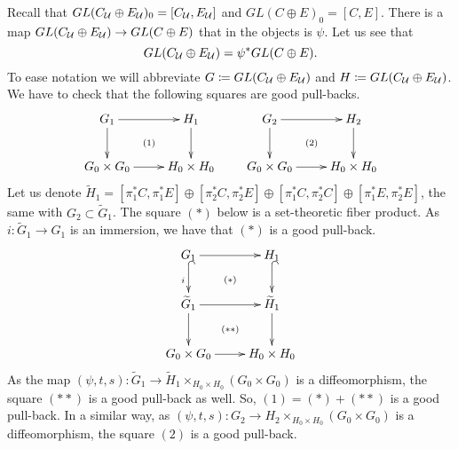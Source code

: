 \begin{example}
Recall that $GL(C_{\mathcal{U}}\oplus E_{\mathcal{U}})_0 = [C_{\mathcal{U}},E_{\mathcal{U}}]$ and $GL(C\oplus E)_0 = [C,E]$.
There is a map $GL(C_{\mathcal{U}}\oplus E_{\mathcal{U}}) \to GL(C\oplus E)$ that in the objects is $\psi$.
Let us see that
$$GL(C_{\mathcal{U}}\oplus E_{\mathcal{U}}) = \psi^* GL(C\oplus E) \text{.} $$
To ease notation we will abbreviate $G\coloneqq GL(C_{\mathcal{U}}\oplus E_{\mathcal{U}})$ and $H\coloneqq GL(C_{\mathcal{U}}\oplus E_{\mathcal{U}})$.
We have to check that the following squares are good pull-backs.
\begin{equation}
\begin{gathered}
\xymatrix{
  G_1 \ar[r] \ar[d] \ar@{}[dr] | {(1)} & H_1 \ar[d] \\
  G_0\times G_0 \ar[r] & H_0\times H_0
} \qquad
\xymatrix{
  G_2 \ar[r] \ar[d] \ar@{}[dr] | {(2)} & H_2 \ar[d] \\
  G_0\times G_0 \ar[r] & H_0\times H_0
}
\end{gathered}
\end{equation}
Let us denote $\widetilde H_1 = [\pi_1^*C,\pi_1^*E]\oplus [\pi_2^*C,\pi_2^*E]\oplus [\pi_1^*C,\pi_2^*C]\oplus [\pi_1^*E,\pi_2^*E]$, the same with $G_2 \subset \widetilde G_1$.
The square $(*)$ below is a set-theoretic fiber product.
As $i: \widetilde G_1\to G_1$ is an immersion, we have that $(*)$ is a good pull-back.
\begin{equation}
\begin{gathered}
\xymatrix{
    G_1 \ar[r] \ar@{^{(}->}[d]_i \ar@{}[dr] | {(*)} & H_1 \ar@{^{(}->}[d] \\
    \widetilde G_1 \ar[r] \ar[d] \ar@{}[dr] | {(**)} & \widetilde H_1 \ar[d] \\
    G_0\times G_0 \ar[r] & H_0\times H_0
}
\end{gathered}
\end{equation}
As the map $(\psi,t,s): \widetilde G_1 \to \widetilde H_1\times_{H_0\times H_0} (G_0\times G_0)$ is a diffeomorphism, the square $(**)$ is a good pull-back as well.
So, $(1) = (*)+(**)$ is a good pull-back.
In a similar way, as $(\psi,t,s): G_2 \to H_2\times_{H_0\times H_0} (G_0\times G_0)$ is a diffeomorphism, the square $(2)$ is a good pull-back.
\end{example}



